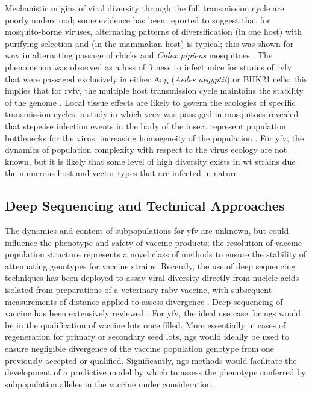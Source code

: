Mechanistic origins of viral diversity through the full transmission cycle are poorly understood; some evidence has been reported to suggest that for mosquito-borne viruses, alternating patterns of diversification (in one host) with purifying selection and (in the mammalian host) is typical; this was shown for \gls{wnv} in alternating passage of chicks and \emph{Culex pipiens} mosquitoes \parencite{Deardorff:2011bd}. The phenomenon was observed as a loss of fitness to infect mice for strains of \gls{rvfv} that were passaged exclusively in either Aag (\emph{Aedes aegyptii}) or BHK21 cells; this implies that for \gls{rvfv}, the multiple host transmission cycle maintains the stability of the genome \parencite{Moutailler:2011hh}. Local tissue effects are likely to govern the ecologies of specific transmission cycles; a study in which \gls{veev} was passaged in mosquitoes revealed that stepwise infection events in the body of the insect represent population bottlenecks for the virus, increasing homogeneity of the population \parencite{Forrester:2012da}. For \gls{yfv}, the dynamics of population complexity with respect to the virus ecology are not known, but it is likely that some level of high diversity exists in \gls{wt} strains due the numerous host and vector types that are infected in nature \parencite{Ellis:2008jt}.

\subsection{Deep Sequencing and Technical Approaches}
The dynamics and content of subpopulations for \gls{yfv} are unknown, but could influence the phenotype and safety of vaccine products; the resolution of vaccine population structure represents a novel class of methods to ensure the stability of attenuating genotypes for vaccine strains. Recently, the use of deep sequencing techniques has been deployed to assay viral diversity directly from nucleic acids isolated from preparations of a veterinary \gls{rabv} vaccine, with subsequent measurements of distance applied to assess divergence \parencite{Hoper:2015fs}.  Deep sequencing of vaccine has been extensively reviewed \parencite{Luciani:2012em,Kennedy:2011ff,Neverov:2010ko}. For \gls{yfv}, the ideal use case for \gls{ngs} would be in the qualification of vaccine lots once filled. More essentially in cases of regeneration for primary or secondary seed lots, \gls{ngs} would ideally be used to ensure negligible divergence of the vaccine population genotype from one previously accepted or qualified. Significantly, \gls{ngs} methods would facilitate the development of a predictive model by which to assess the phenotype conferred by subpopulation alleles in the vaccine under consideration.

